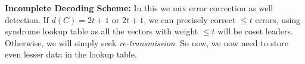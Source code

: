 \documentclass[../main.tex]{subfiles}
\begin{document}
\textbf{Incomplete Decoding Scheme:} In this we mix error correction as well detection. If $d(C)=2t+1$ or $2t+1$, we can precisely correct $\leq t$ errors, using syndrome lookup table as all the vectors with weight $\leq t$ will be coset leaders. Otherwise, we will simply seek \emph{re-transmission}. So now, we now need to store even lesser data in the lookup table. 
\end{document}
